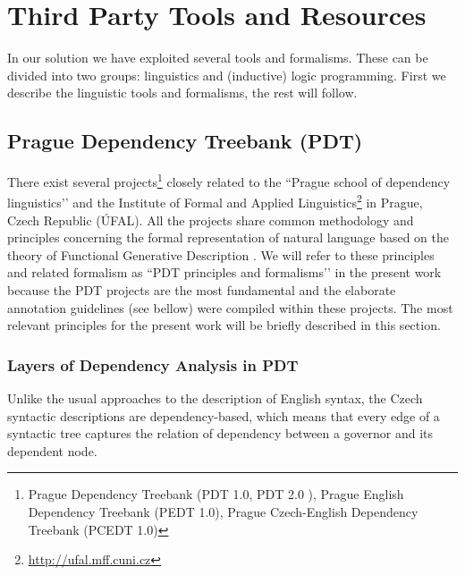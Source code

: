\chapter{Third Party Tools and Resources}

\graphicspath{{../img/ch30/}}


In our solution we have exploited several tools and formalisms. These can be divided into two groups: linguistics and (inductive) logic programming. First we describe the linguistic tools and formalisms, the rest will follow.



\section{Prague Dependency Treebank (PDT)} \label{sec:ch30_pdt}
There exist several projects\footnote{Prague Dependency Treebank
 (PDT 1.0, PDT 2.0 \citep{biblio:PDT20_CD}), Prague English Dependency Treebank (PEDT 1.0), Prague Czech-English Dependency Treebank (PCEDT 1.0)} 
closely related to the ``Prague school of dependency linguistics’’ and the Institute of Formal and Applied Linguistics\footnote{\url{http://ufal.mff.cuni.cz}} in Prague, Czech Republic (ÚFAL). All the projects share common methodology and principles concerning the formal representation of natural language %
 based on the theory of Functional Generative Description \citep{SgallHajicovaPanevova1986}.
We will refer to these principles and related formalism as ``PDT principles and formalisms’’ in the present work because the PDT projects are the most fundamental and the elaborate annotation guidelines (see bellow) were compiled within these projects. The most relevant principles for the present work will be briefly described in this section.

\subsection{Layers of Dependency Analysis in PDT}

Unlike the usual approaches to the description of English syntax, the Czech syntactic descriptions are dependency-based, which means that every edge of a syntactic tree captures the relation of dependency between a governor and its dependent node. 

